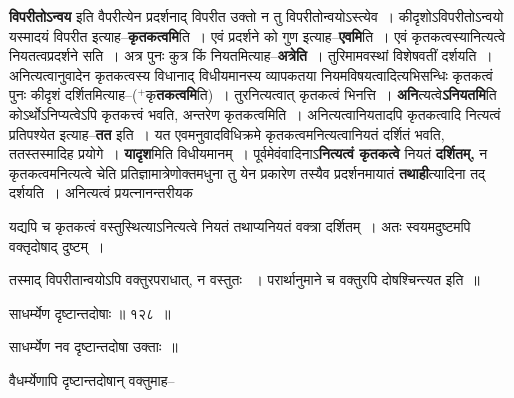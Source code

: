 \documentclass[article,12pt,a4paper]{memoir}
\newcommand{\add}[1]{($^{+}$#1)}
\begin{document}
	  \pstart \textbf{विपरीतोऽन्वय} इति वैपरीत्येन प्रदर्शनाद् विपरीत उक्तो न तु विपरीतोन्वयोऽस्त्येव । कीदृशोऽविपरीतोऽन्वयो यस्मादयं विपरीत इत्याह--\textbf{कृतकत्वमि}ति । एवं प्रदर्शने को गुण इत्याह--\textbf{एवमि}ति । एवं कृतकत्वस्यानित्यत्वे नियतत्वप्रदर्शने सति । अत्र पुनः कुत्र किं नियतमित्याह--\textbf{अत्रेति} । तुरिमामवस्थां विशेषवतीं दर्शयति । अनित्यत्वानुवादेन कृतकत्वस्य विधानाद् विधीयमानस्य व्यापकतया नियमविषयत्वादित्यभिसन्धिः कृतकत्वं पुनः कीदृशं दर्शितमित्याह--\add{कृ\textbf{तकत्वमि}ति} । तुरनित्यत्वात् कृतकत्वं भिनत्ति । \textbf{अनि}त्यत्वे\textbf{ऽनियतमि}ति कोऽर्थोऽनिप्यत्वेऽपि कृतकत्त्वं भवति, अन्तरेण कृतकत्वमिति । अनित्यत्वानियतादपि कृतकत्वादि  नित्यत्वं प्रतिपश्येत इत्याह--\textbf{तत} इति । यत एवमनुवादविधिक्रमे कृतकत्वमनित्यत्वानियतं दर्शितं भवति, ततस्तस्मादिह प्रयोगे । \textbf{यादृश}मिति विधीयमानम् । पूर्वमेवंवादिनाऽ\textbf{नित्यत्वं कृतकत्वे} नियतं \textbf{दर्शितम्,} न कृतकत्वमनित्यत्वे चेति प्रतिज्ञामात्रेणोक्तमधुना तु येन प्रकारेण तस्यैव प्रदर्शनमायातं \textbf{तथाही}त्यादिना तद् दर्शयति । अनित्यत्वं प्रयत्नानन्तरीयक  \leavevmode{} 
	  
	यद्यपि च कृतकत्वं वस्तुस्थित्याऽनित्यत्वे नियतं तथाप्यनियतं वक्त्रा दर्शितम् । अतः स्वयमदुष्टमपि वक्तृदोषाद् दुष्टम् ।  
	  
	तस्माद् विपरीतान्वयोऽपि वक्तुरपराधात्, न वस्तुतः  । परार्थानुमाने च वक्तुरपि दोषश्चिन्त्यत इति ॥  
	  
	साधर्म्येण दृष्टान्तदोषाः ॥ १२८ ॥ 
	  
	साधर्म्येण नव दृष्टान्तदोषा उक्ताः ॥  
	  
	वैधर्म्येणापि दृष्टान्तदोषान् वक्तुमाह--  
	  
\end{document}
